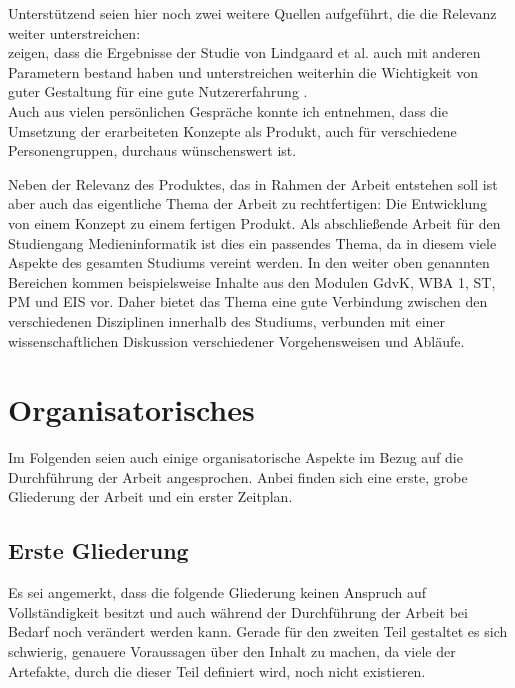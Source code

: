 Unterstützend seien hier noch zwei weitere Quellen aufgeführt, die die Relevanz weiter unterstreichen:\\
\cite{tractinsky2006evaluating} zeigen, dass die Ergebnisse der Studie von Lindgaard et al. auch mit anderen Parametern bestand haben und unterstreichen weiterhin die Wichtigkeit von guter Gestaltung für eine gute Nutzererfahrung \cite{tractinsky2000beautiful}.\\
Auch aus vielen persönlichen Gespräche konnte ich entnehmen, dass die Umsetzung der erarbeiteten Konzepte als Produkt, auch für verschiedene Personengruppen, durchaus wünschenswert ist.

Neben der Relevanz des Produktes, das in Rahmen der Arbeit entstehen soll ist aber auch das eigentliche Thema der Arbeit zu rechtfertigen: Die Entwicklung von einem Konzept zu einem fertigen Produkt.
Als abschließende Arbeit für den Studiengang Medieninformatik ist dies ein passendes Thema, da in diesem viele Aspekte des gesamten Studiums vereint werden. In den weiter oben genannten Bereichen kommen beispielsweise Inhalte aus den Modulen GdvK, WBA 1, ST,  PM und EIS vor. Daher bietet das Thema eine gute Verbindung zwischen den verschiedenen Disziplinen innerhalb des Studiums, verbunden mit einer wissenschaftlichen Diskussion verschiedener Vorgehensweisen und Abläufe.

\section{Organisatorisches}

Im Folgenden seien auch einige organisatorische Aspekte im Bezug auf die Durchführung der Arbeit angesprochen. Anbei finden sich eine erste, grobe Gliederung der Arbeit und ein erster Zeitplan.

\subsection{Erste Gliederung}
Es sei angemerkt, dass die folgende Gliederung keinen Anspruch auf Vollständigkeit besitzt und auch während der Durchführung der Arbeit bei Bedarf noch verändert werden kann.
Gerade für den zweiten Teil gestaltet es sich schwierig, genauere Voraussagen über den Inhalt zu machen, da viele der Artefakte, durch die dieser Teil definiert wird, noch nicht existieren.

